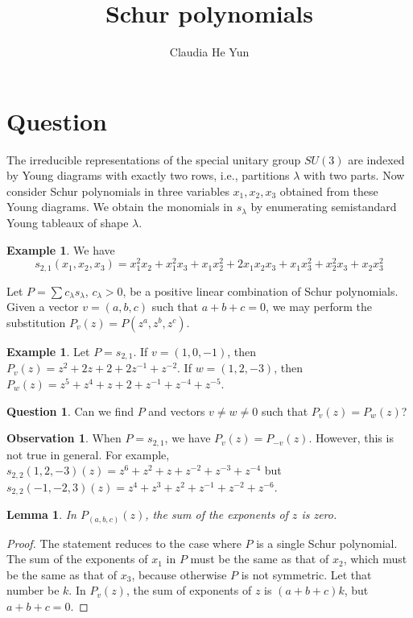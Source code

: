 \documentclass[12pt]{amsart}
\title{Schur polynomials}
\author{Claudia He Yun}
\newtheorem{lem}[thm]{Lemma}
\theoremstyle{definition}
\newtheorem{example}[thm]{Example}
\newtheorem{quest}[thm]{Question}
\newtheorem{obsv}[thm]{Observation}
\begin{document}
	
\maketitle

\section{Question}
The irreducible representations of the special unitary group $SU(3)$ are indexed by Young diagrams with exactly two rows, i.e., partitions $\lambda$ with two parts. Now consider Schur polynomials in three variables $x_1,x_2,x_3$ obtained from these Young diagrams. We obtain the monomials in $s_\lambda$ by enumerating semistandard Young tableaux of shape $\lambda$.

\begin{example}
We have \[s_{2,1}(x_1,x_2,x_3) = x_1^2x_2+x_1^2x_3 + x_1x_2^2 + 2x_1x_2x_3 + x_1x_3^2 + x_2^2x_3 + x_2x_3^2\]
\end{example}

Let $P = \sum c_\lambda s_\lambda$, $c_\lambda > 0$, be a positive linear combination of Schur polynomials. Given a vector $v=(a,b,c)$ such that $a+b+c=0$, we may perform the substitution $P_v(z) = P(z^a,z^b,z^c)$.

\begin{example}
Let $P = s_{2,1}$. If $v = (1,0,-1)$, then $P_v(z) = z^2 + 2z +2+ 2z^{-1} + z^{-2}$. If $w = (1,2,-3)$, then $P_w(z) = z^5+z^4+z +2+z^{-1} + z^{-4} + z^{-5}$.
\end{example}

\begin{quest}
Can we find $P$ and vectors $v\neq w \neq 0$ such that $P_v(z) = P_w(z)$?
\end{quest}

\begin{obsv}
When $P = s_{2,1}$, we have $P_v(z) = P_{-v}(z)$. However, this is not true in general. For example, $s_{2,2}(1,2,-3)(z) = z^6 + z^2 + z + z^{-2} + z^{-3} + z^{-4}$ but $s_{2,2}(-1,-2,3)(z) = z^4 + z^3 + z^2 + z^{-1} + z^{-2} + z^{-6}$.
\end{obsv}

\begin{lem}
In $P_{(a,b,c)}(z)$, the sum of the exponents of $z$ is zero.
\end{lem}

\begin{proof}
The statement reduces to the case where $P$ is a single Schur polynomial. The sum of the exponents of $x_1$ in $P$ must be the same as that of $x_2$, which must be the same as that of $x_3$, because otherwise $P$ is not symmetric. Let that number be $k$. In $P_v(z)$, the sum of exponents of $z$ is $(a+b+c)k$, but $a+b+c=0$. 
\end{proof}



\end{document}
